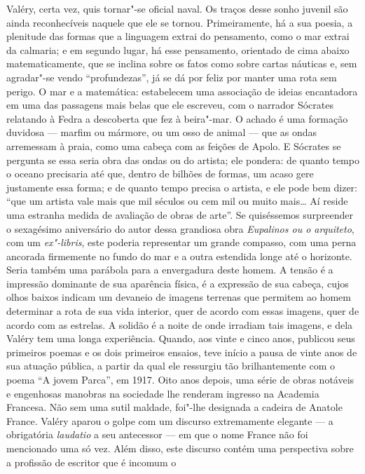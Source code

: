 Valéry, certa vez, quis tornar"-se oficial naval. Os traços desse sonho
juvenil são ainda reconhecíveis naquele que ele se tornou.
Primeiramente, há a sua poesia, a plenitude das formas que a linguagem
extrai do pensamento, como o mar extrai da calmaria; e em segundo lugar,
há esse pensamento, orientado de cima abaixo matematicamente, que se
inclina sobre os fatos como sobre cartas náuticas e, sem agradar"-se
vendo ``profundezas'', já se dá por feliz por manter uma rota sem
perigo. O mar e a matemática: estabelecem uma associação de ideias
encantadora em uma das passagens mais belas que ele escreveu, com o
narrador Sócrates relatando à Fedra a descoberta que fez à beira"-mar. O
achado é uma formação duvidosa --- marfim ou mármore, ou um osso de animal
--- que as ondas arremessam à praia, como uma cabeça com as feições de Apolo.
E Sócrates se pergunta se essa seria obra das ondas ou do
artista; ele pondera: de quanto tempo o oceano precisaria
até que, dentro de bilhões de formas, um acaso gere justamente essa
forma; e de quanto tempo precisa o artista, e ele pode bem dizer: ``que um
artista vale mais que mil séculos ou cem mil ou muito mais\ldots{} Aí
reside uma estranha medida de avaliação de obras de arte''. Se
quiséssemos surpreender o sexagésimo
aniversário do autor dessa grandiosa obra \emph{Eupalinos ou o arquiteto},
com um \emph{ex"-libris}, este poderia representar um grande compasso, com uma perna ancorada firmemente no
fundo do mar e a outra estendida longe até o horizonte. Seria também uma
parábola para a envergadura deste homem. A tensão é a impressão
dominante de sua aparência física, é a expressão de sua cabeça, cujos
olhos baixos indicam um devaneio de imagens terrenas que permitem ao
homem determinar a rota de sua vida interior, quer de acordo com essas
imagens, quer de acordo com as estrelas. A solidão é a noite de onde
irradiam tais imagens, e dela Valéry tem uma longa experiência. Quando,
aos vinte e cinco anos, publicou seus primeiros poemas e os dois
primeiros ensaios, teve início a pausa de vinte anos de sua atuação
pública, a partir da qual ele ressurgiu tão brilhantemente com o poema
``A jovem Parca'', em 1917. Oito anos depois, uma série de obras notáveis
​​e engenhosas manobras na sociedade lhe renderam ingresso na Academia
Francesa. Não sem uma sutil maldade, foi"-lhe designada a cadeira de
Anatole France. Valéry aparou o golpe com um discurso extremamente
elegante --- a obrigatória \emph{laudatio} a seu antecessor --- em que o
nome France não foi mencionado uma só vez. Além disso, este discurso
contém uma perspectiva sobre a profissão de escritor que é incomum o
